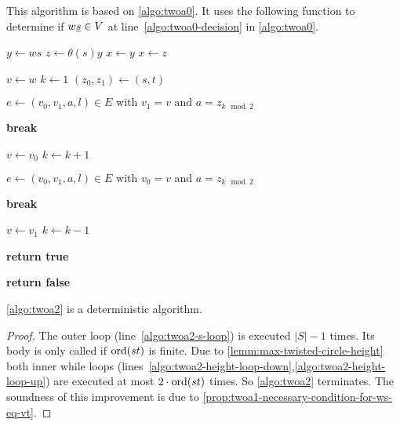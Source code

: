 \begin{algo}[TWOA2]
	This algorithm is based on \ref{algo:twoa0}. It uses the following function to determine if $w \underline{s} \in V$ at line~\ref{algo:twoa0-decision} in \ref{algo:twoa0}.

	\begin{algorithmic}[1]
		\State $y \gets ws$
		\State $z \gets \theta(s)y$
		 
			\State $x \gets y$
		\Else
			\State $x \gets z$
		\EndIf

		 \label{algo:twoa2-s-loop}
				\State $v \gets w$
				\State $k \gets 1$
				\State $(z_0,z_1) \gets (s,t)$

				 \label{algo:twoa2-height-loop-down} 
					\State $e \gets (v_0,v_1,a,l) \in E \textrm{ with } v_1 = v \textrm{ and } a = z_{k \mod 2}$

						\State \textbf{break}
					\EndIf

					\State $v \gets v_0$
					\State $k \gets k + 1$
				\EndWhile

				 \label{algo:twoa2-height-loop-up} 
					\State $e \gets (v_0,v_1,a,l) \in E \textrm{ with } v_0 = v \textrm{ and } a = z_{k \mod 2}$

						\State \textbf{break}
					\EndIf

					\State $v \gets v_1$
					\State $k \gets k - 1$
				\EndWhile

				 
					 
						\State \textbf{return true}
					\EndIf
				\EndIf
			\EndIf
		\EndFor

		\State \textbf{return false}
	\EndProcedure
	\end{algorithmic}
\end{algo}

\begin{lemm}
	\ref{algo:twoa2} is a deterministic algorithm.

	\begin{proof}
		The outer loop (line~\ref{algo:twoa2-s-loop}) is executed $|S|-1$ times. Its body is only called if $\operatorname{ord}(st)$ is finite. Due to \ref{lemm:max-twisted-circle-height} both inner while loops (lines~\ref{algo:twoa2-height-loop-down},\ref{algo:twoa2-height-loop-up}) are executed at most $2 \cdot \operatorname{ord}(st)$ times. So \ref{algo:twoa2} terminates. The soundness of this improvement is due to \ref{prop:twoa1-necessary-condition-for-ws-eq-vt}.
	\end{proof}
\end{lemm}

